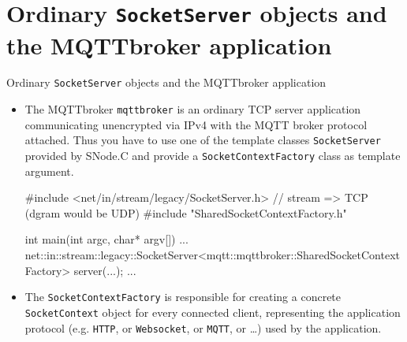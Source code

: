 \section[nosectionpage]{Ordinary \texttt{SocketServer} objects and the MQTTbroker application}

\begin{frame}[fragile]{Ordinary \texttt{SocketServer} objects and the MQTTbroker application}
  \begin{itemize}
    \item The MQTTbroker \texttt{\alert{mqttbroker}} is an ordinary \alert{TCP server} application communicating \alert{unencrypted} via \alert{IPv4} with the MQTT broker protocol attached.
    Thus you have to use one of the \alert{template classes \texttt{SocketServer}} provided by SNode.C and provide a \texttt{\alert{SocketContextFactory}} class as \alert{template argument}.

    \begin{cppcode}[gobble=4]
      #include <net/in/stream/legacy/SocketServer.h> // stream => TCP (dgram would be UDP)
      #include "SharedSocketContextFactory.h"

      int main(int argc, char* argv[]) {
        ...
        net::in::stream::legacy::SocketServer<mqtt::mqttbroker::SharedSocketContextFactory> server(...);
        ...
      }
    \end{cppcode}
    \item The \texttt{\alert{SocketContextFactory}} is responsible for \alert{creating} a concrete \texttt{\alert{SocketContext}} object for \alert{every connected client}, \alert{representing} the \alert{application protocol} (e.g. \texttt{\alert{HTTP}}, or \texttt{\alert{Websocket}}, or \texttt{\alert{MQTT}}, or \ldots) used by the application.
  \end{itemize}
\end{frame}
